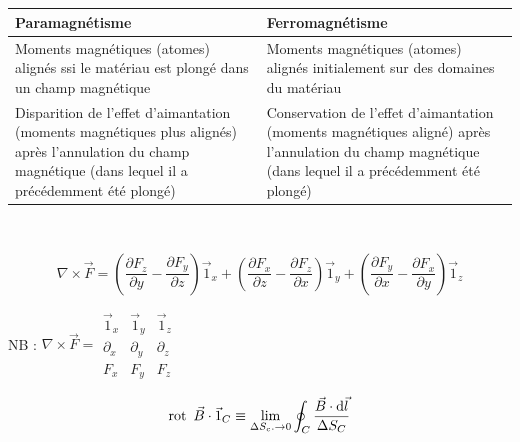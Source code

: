 \documentclass	[11pt, a4paper, openany]{book}
\newcommand{\rot}{\text{rot}\,}
\begin{document}
\\\\
\renewcommand{\arraystretch}{1.8}
\begin{tabular}{|p{7.55cm}|p{7.55cm}|}
\hline
 Paramagnétisme & Ferromagnétisme \\
 \hline
 Moments magnétiques (atomes) alignés  ssi le matériau est plongé dans un champ magnétique &  Moments magnétiques (atomes) alignés initialement sur des domaines du matériau\\
 \hline
 Disparition de l'effet d'aimantation (moments magnétiques plus alignés) après l'annulation du champ magnétique (dans lequel il a précédemment été  plongé) &  Conservation de l'effet d'aimantation (moments magnétiques aligné) après l'annulation du champ magnétique (dans lequel il a précédemment été  plongé) \\
 \hline
\end{tabular}\\


$$ \nabla \times \vec F = \left(\frac{\partial F_z}{\partial y} - \frac{\partial F_y}{\partial z}\right)\vec 1_x + \left(\frac{\partial F_x}{\partial z} - \frac{\partial F_z}{\partial x}\right)\vec 1_y + \left(\frac{\partial F_y}{\partial x} - \frac{\partial F_x}{\partial y}\right)\vec 1_z $$

NB : $ \nabla \times \vec F = \begin{array}{|ccc|}
\vec 1_x & \vec 1_y & \vec  1_z \\ 
\partial_x & \partial_y & \partial_z \\ 
F_x & F_y & F_z
\end{array} $


$$ \rot\ \vec B \cdot \vec 1_C \equiv \lim_{\Delta S_c. \rightarrow 0} \oint_{C} \dfrac{\vec B \cdot {\rm d}\vec l}{\Delta S_C} $$

\end{document}
